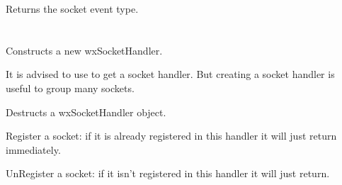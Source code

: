 
Returns the socket event type.

\section{}\label{wxsockethandler}




%
%


Constructs a new wxSocketHandler.

It is advised to use  to
get a socket handler. But creating a socket handler is useful to group
many sockets.

%
%


Destructs a wxSocketHandler object.

%
%


Register a socket: if it is already registered in this handler it will just
return immediately.



%
%


UnRegister a socket: if it isn't registered in this handler it will just
return.


